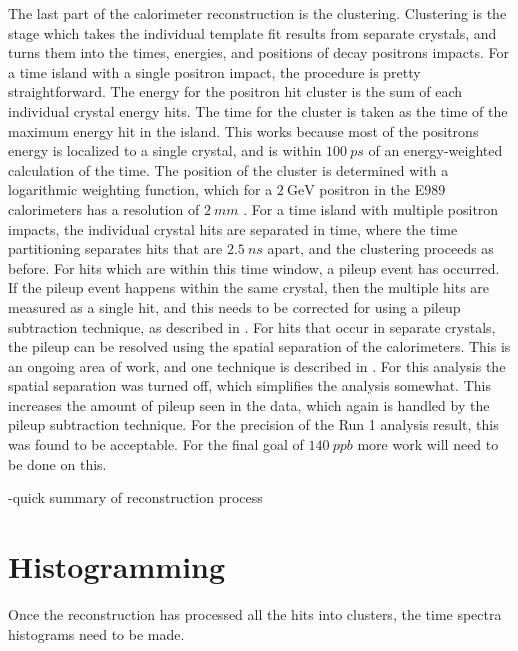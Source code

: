 The last part of the calorimeter reconstruction is the clustering. Clustering is the stage which takes the individual template fit results from separate crystals, and turns them into the times, energies, and positions of decay positrons impacts. For a time island with a single positron impact, the procedure is pretty straightforward. The energy for the positron hit cluster is the sum of each individual crystal energy hits. The time for the cluster is taken as the time of the maximum energy hit in the island. This works because most of the positrons energy is localized to a single crystal, and is within $\SI{100}{ps}$ of an energy-weighted calculation of the time. The position of the cluster is determined with a logarithmic weighting function, which for a $\SI{2}{\GeV}$ positron in the E989 calorimeters has a resolution of $\SI{2}{mm}$ \cite{AFThesis}. For a time island with multiple positron impacts, the individual crystal hits are separated in time, where the time partitioning separates hits that are $\SI{2.5}{ns}$ apart, and the clustering proceeds as before. For hits which are within this time window, a pileup event has occurred. If the pileup event happens within the same crystal, then the multiple hits are measured as a single hit, and this needs to be corrected for using a pileup subtraction technique, as described in . For hits that occur in separate crystals, the pileup can be resolved using the spatial separation of the calorimeters. This is an ongoing area of work, and one technique is described in . For this analysis the spatial separation was turned off, which simplifies the analysis somewhat. This increases the amount of pileup seen in the data, which again is handled by the pileup subtraction technique. For the precision of the Run 1 analysis result, this was found to be acceptable. For the final goal of $\SI{140}{ppb}$ more work will need to be done on this.





-quick summary of reconstruction process







\section{Histogramming}
\label{sec:Histogramming}


Once the reconstruction has processed all the hits into clusters, the time spectra histograms need to be made.



